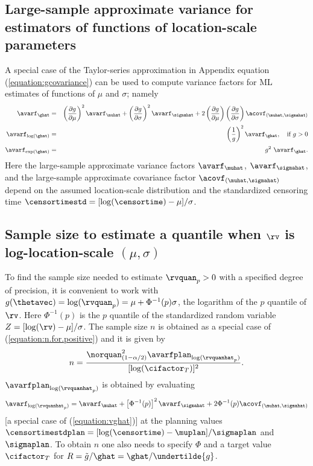 \subsection{Large-sample approximate variance for 
estimators of functions of location-scale parameters}
\label{section:avar.functions.lc}

A special case of the Taylor-series approximation in Appendix
equation (\ref{equation:gcovariance}) can be used to compute
variance factors for ML estimates of functions of $\mu$ and
$\sigma$; namely
\begin{eqnarray}
\label{equation:vghat}
\avarf_{\ghat}&=&
\left (\frac{ \partial g}{ \partial \mu} \right )^2 \avarf_{\muhat} + 
 \left (\frac{ \partial g}{ \partial \sigma}\right)^2 \avarf_{\sigmahat} +
 2 \left( \frac{ \partial g}{ \partial \mu} \right)
\left( \frac{ \partial g}{\partial \sigma} \right)
\acovf_{(\muhat, \sigmahat)} \\[.5ex] \nonumber
\avarf_{\log(\ghat)}&=& \left (\frac{1}{g} \right ) ^{2}  \avarf_{\ghat},
\quad \text{if $g>0$} \\[.5ex] \nonumber
\avarf_{\exp(\ghat)}&=& g ^{2} \,\,  \avarf_{\ghat}.
\end{eqnarray}
Here the large-sample approximate variance factors
$\avarf_{\muhat}$, $\avarf_{\sigmahat}$, and the large-sample
approximate covariance factor $\acovf_{(\muhat, \sigmahat)}$ depend
on the assumed location-scale distribution and the standardized
censoring time $\censortimestd=[\log(\censortime)-\mu]/\sigma$.

\subsection{Sample size to estimate a quantile 
when $\rv$ is log-location-scale $(\mu, \sigma)$}

To find the sample size needed to estimate $\rvquan_{p}>0$ with a
specified degree of precision, it is convenient to work with
$g(\thetavec)=\log(\rvquan_{p})=\mu + \Phi^{-1}(p) \sigma$, the
logarithm of the $p$ quantile of $\rv$. Here $\Phi^{-1}(p)$ is the
$p$ quantile of the standardized random variable
$Z=[\log(\rv)-\mu]/\sigma$.  The sample size $n$ is obtained as a
special case of (\ref{equation:n.for.positive}) and it is given by
\begin{displaymath}
n = \frac{\norquan_{(1-\alpha/2)}^{2} \avarfplan_{\log(\rvquanhat_{p})}}{[\log(\cifactor_{T})]^2}.
\end{displaymath}
$\avarfplan_{\log(\rvquanhat_{p})}$ is obtained by evaluating
\begin{equation}
\label{equation:avar.lc.quan}
\avarf_{\log(\rvquanhat_{p})}=
	 \avarf_{\muhat} +\left [\Phi^{-1}(p) \right ]^{2} \avarf_{\sigmahat}
     +2 \Phi^{-1}(p) \acovf_{(\muhat, \sigmahat)}
\end{equation}
[a special case of (\ref{equation:vghat})] at the planning values
$\censortimestdplan=[\log(\censortime)-\muplan]/\sigmaplan$ and
$\sigmaplan$.  To obtain $n$ one also needs to specify $\Phi$ and a
target value $\cifactor_{T}$ for
$R=\tilde{g}/\ghat=\ghat/\undertilde{g}$.

